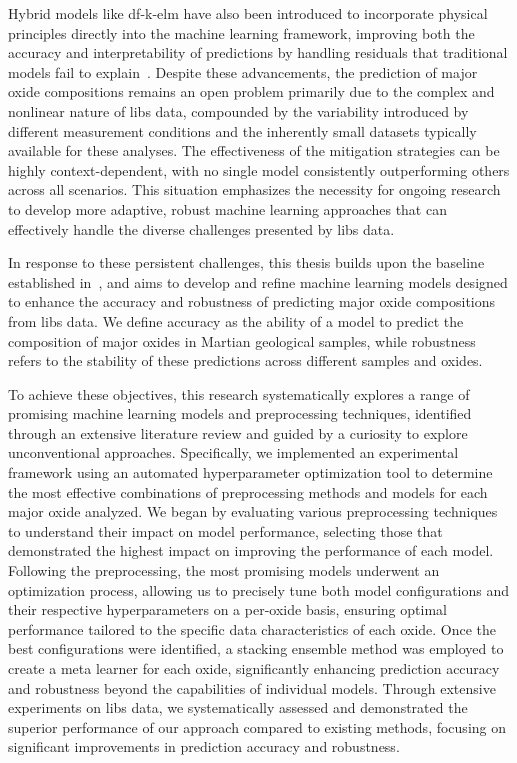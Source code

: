 Hybrid models like \gls{df}-\gls{k-elm} have also been introduced to incorporate physical principles directly into the machine learning framework, improving both the accuracy and interpretability of predictions by handling residuals that traditional models fail to explain~\cite{song_DF-K-ELM}. 
Despite these advancements, the prediction of major oxide compositions remains an open problem primarily due to the complex and nonlinear nature of \gls{libs} data, compounded by the variability introduced by different measurement conditions and the inherently small datasets typically available for these analyses. 
The effectiveness of the mitigation strategies can be highly context-dependent, with no single model consistently outperforming others across all scenarios. 
This situation emphasizes the necessity for ongoing research to develop more adaptive, robust machine learning approaches that can effectively handle the diverse challenges presented by \gls{libs} data.

In response to these persistent challenges, this thesis builds upon the baseline established in~\citet{p9_paper}, and aims to develop and refine machine learning models designed to enhance the accuracy and robustness of predicting major oxide compositions from \gls{libs} data. 
We define accuracy as the ability of a model to predict the composition of major oxides in Martian geological samples, while robustness refers to the stability of these predictions across different samples and oxides.

To achieve these objectives, this research systematically explores a range of promising machine learning models and preprocessing techniques, identified through an extensive literature review and guided by a curiosity to explore unconventional approaches. 
Specifically, we implemented an experimental framework using an automated hyperparameter optimization tool to determine the most effective combinations of preprocessing methods and models for each major oxide analyzed. 
We began by evaluating various preprocessing techniques to understand their impact on model performance, selecting those that demonstrated the highest impact on improving the performance of each model.
Following the preprocessing, the most promising models underwent an optimization process, allowing us to precisely tune both model configurations and their respective hyperparameters on a per-oxide basis, ensuring optimal performance tailored to the specific data characteristics of each oxide. 
Once the best configurations were identified, a stacking ensemble method was employed to create a meta learner for each oxide, significantly enhancing prediction accuracy and robustness beyond the capabilities of individual models. 
Through extensive experiments on \gls{libs} data, we systematically assessed and demonstrated the superior performance of our approach compared to existing methods, focusing on significant improvements in prediction accuracy and robustness.

